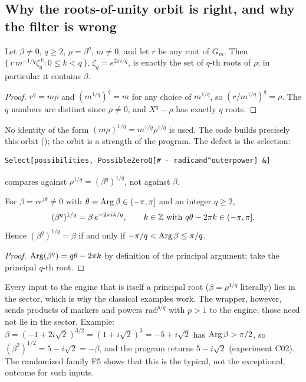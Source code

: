 \subsection{Why the roots-of-unity orbit is right, and why the filter is wrong}
\label{sec:branch}
\begin{proposition}\label{prop:orbit}
Let $\beta\ne0$, $q\ge2$, $\rho=\beta^q$, $m\ne0$, and let $r$ be any root of
$G_m$. Then $\{\,r\,m^{-1/q}\zeta_q^{\,k}: 0\le k<q\,\}$, $\zeta_q=e^{2\pi i/q}$, is
exactly the set of $q$-th roots of $\rho$; in particular it contains $\beta$.
\end{proposition}
\begin{proof}
$r^q=m\rho$ and $(m^{1/q})^q=m$ for any choice of $m^{1/q}$, so
$(r/m^{1/q})^q=\rho$. The $q$ numbers are distinct since $\rho\ne0$, and
$X^q-\rho$ has exactly $q$ roots.
\end{proof}
No identity of the form $(m\rho)^{1/q}=m^{1/q}\rho^{1/q}$ is used. The code
builds precisely this orbit (); the orbit is a strength of the
program. The defect is the selection:
\begin{lstlisting}
Select[possibilities, PossibleZeroQ[# - radicand^outerpower] &]
\end{lstlisting}
compares against $\rho^{1/q}=(\beta^q)^{1/q}$, not against $\beta$.
\begin{proposition}\label{prop:principal}
For $\beta=re^{i\theta}\ne0$ with $\theta=\operatorname{Arg}\beta\in(-\pi,\pi]$ and an
integer $q\ge2$,
\[
(\beta^q)^{1/q}=\beta\,e^{-2\pi ik/q},\qquad k\in\mathbb{Z}\text{ with }q\theta-2\pi k\in(-\pi,\pi].
\]
Hence $(\beta^q)^{1/q}=\beta$ if and only if $-\pi/q<\operatorname{Arg}\beta\le\pi/q$.
\end{proposition}
\begin{proof}
$\operatorname{Arg}(\beta^q)=q\theta-2\pi k$ by definition of the principal argument; take the
principal $q$-th root.
\end{proof}
Every input to the engine that is itself a principal root
($\beta=\rho^{1/q}$ literally) lies in the sector, which is why the classical
examples work. The wrapper, however, sends products of markers and powers
$\text{rad}^{p/q}$ with $p>1$ to the engine; those need not lie in the sector.
Example: $\beta=(-1+2i\sqrt2)^{3/2}=(1+i\sqrt2)^3=-5+i\sqrt2$ has
$\operatorname{Arg}\beta>\pi/2$, so $(\beta^2)^{1/2}=5-i\sqrt2=-\beta$, and the program returns
$5-i\sqrt2$ (experiment C02). The randomized family F5 shows that this is the
typical, not the exceptional, outcome for such inputs.

